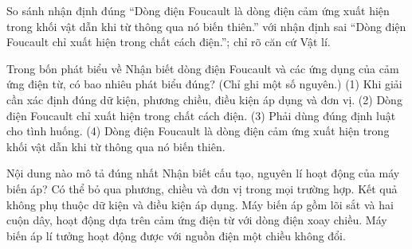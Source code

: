 \begin{bt}
So sánh nhận định đúng “Dòng điện Foucault là dòng điện cảm ứng xuất hiện trong khối vật dẫn khi từ thông qua nó biến thiên.” với nhận định sai “Dòng điện Foucault chỉ xuất hiện trong chất cách điện.”; chỉ rõ căn cứ Vật lí.
\end{bt}

\begin{ex}
Trong bốn phát biểu về Nhận biết dòng điện Foucault và các ứng dụng của cảm ứng điện từ, có bao nhiêu phát biểu đúng? (Chỉ ghi một số nguyên.) (1) Khi giải cần xác định đúng dữ kiện, phương chiều, điều kiện áp dụng và đơn vị. (2) Dòng điện Foucault chỉ xuất hiện trong chất cách điện. (3) Phải dùng đúng định luật cho tình huống. (4) Dòng điện Foucault là dòng điện cảm ứng xuất hiện trong khối vật dẫn khi từ thông qua nó biến thiên.
\end{ex}

\begin{ex}
Nội dung nào mô tả đúng nhất Nhận biết cấu tạo, nguyên lí hoạt động của máy biến áp?
\choice
{Có thể bỏ qua phương, chiều và đơn vị trong mọi trường hợp.}
{Kết quả không phụ thuộc dữ kiện và điều kiện áp dụng.}
{\True Máy biến áp gồm lõi sắt và hai cuộn dây, hoạt động dựa trên cảm ứng điện từ với dòng điện xoay chiều.}
{Máy biến áp lí tưởng hoạt động được với nguồn điện một chiều không đổi.}
\end{ex}

